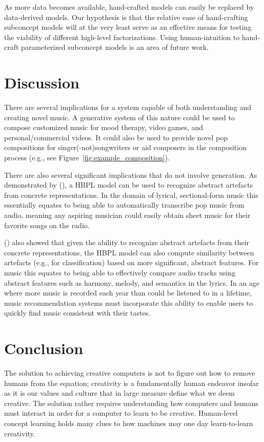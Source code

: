 \documentclass[letterpaper]{article}
\begin{document}
As more data becomes available, hand-crafted models can easily be replaced by data-derived models. Our hypothesis is that the relative ease of hand-crafting subconcept models will at the very least serve as an effective means for testing the viability of different high-level factorizations. Using human-intuition to hand-craft parameterized subconcept models is an area of future work.

\section{Discussion}

There are several implications for a system capable of both understanding and creating novel music. A generative system of this nature could be used to compose customized music for mood therapy, video games, and personal/commercial videos. It could also be used to provide novel pop compositions for singer(-not)songwriters or aid composers in the composition process (e.g., see Figure~\ref{fig:example_composition}).

There are also several significant implications that do not involve generation. As demonstrated by \citeauthor{lake2015human} (\citeyear{lake2015human}), a HBPL model can be used to recognize abstract artefacts from concrete representations. In the domain of lyrical, sectional-form music this essentially equates to being able to automatically transcribe pop music from audio, meaning any aspiring musician could easily obtain sheet music for their favorite songs on the radio.

\citeauthor{lake2015human} (\citeyear{lake2015human}) also showed that given the ability to recognize abstract artefacts from their concrete representations, the HBPL model can also compute similarity between artefacts (e.g., for classification) based on more significant, abstract features. For music this equates to being able to effectively compare audio tracks using abstract features such as harmony, melody, and semantics in the lyrics. In an age where more music is recorded each year than could be listened to in a lifetime, music recommendation systems must incorporate this ability to enable users to quickly find music consistent with their tastes.

\section{Conclusion}

The solution to achieving creative computers is not to figure out how to remove humans from the equation; creativity is a fundamentally human endeavor insofar as it is our values and culture that in large measure define what we deem creative. The solution rather requires understanding how computers and humans must interact in order for a computer to learn to be creative. Human-level concept learning holds many clues to how machines may one day learn-to-learn creativity.



\end{document}
